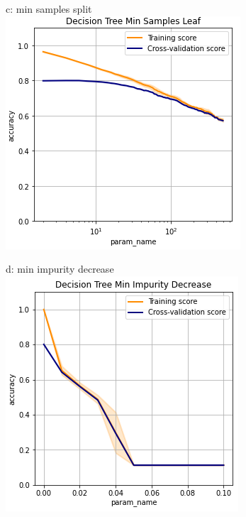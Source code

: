 \documentclass{article}
\begin{document}
\begin{figure}
\begin{subfigure}{.24\textwidth}
	\end{subfigure}
	\begin{subfigure}{.24\textwidth}
		\centering
		c: min samples split\\
		\includegraphics[width=\linewidth]{mnist_decision_min_samples_leaf.png}
		
	\end{subfigure}
	\begin{subfigure}{.24\textwidth}
		\centering
		d: min impurity decrease\\
		\includegraphics[width=\linewidth]{mnist_decision_min_impurity_decrease.png}
		

\end{subfigure}
\end{figure}
\end{document}
